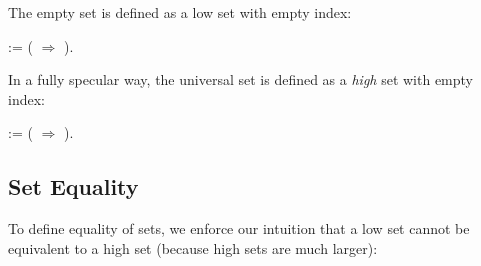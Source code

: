 \begin{example}\label{ex:EUNF2}
The empty set is defined as a low set with empty index:

  \begin{coqdoccode}
    \coqdocnoindent
      :=   (  \ensuremath{\Rightarrow}    ).\coqdoceol
    \coqdocemptyline
  \end{coqdoccode}

  In a fully specular way, the universal set is defined as a \emph{high} set with empty index:

  \begin{coqdoccode}
    \coqdocnoindent
      :=   (  \ensuremath{\Rightarrow}    ).\coqdoceol
    \coqdocemptyline
  \end{coqdoccode}
\end{example}

\subsection{Set Equality}

To define equality of \NFO{} sets, we enforce our intuition that a low set cannot be equivalent to a high set (because high sets are much larger):

